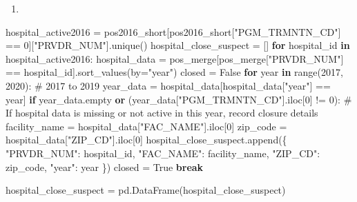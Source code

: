 \documentclass[
  letterpaper,
  DIV=11,
  numbers=noendperiod]{scrartcl}
\newenvironment{Shaded}{\begin{snugshade}}{\end{snugshade}}
\newcommand{\BuiltInTok}[1]{\textcolor[rgb]{0.00,0.23,0.31}{#1}}
\newcommand{\CommentTok}[1]{\textcolor[rgb]{0.37,0.37,0.37}{#1}}
\newcommand{\ControlFlowTok}[1]{\textcolor[rgb]{0.00,0.23,0.31}{\textbf{#1}}}
\newcommand{\DecValTok}[1]{\textcolor[rgb]{0.68,0.00,0.00}{#1}}
\newcommand{\KeywordTok}[1]{\textcolor[rgb]{0.00,0.23,0.31}{\textbf{#1}}}
\newcommand{\NormalTok}[1]{\textcolor[rgb]{0.00,0.23,0.31}{#1}}
\newcommand{\OperatorTok}[1]{\textcolor[rgb]{0.37,0.37,0.37}{#1}}
\newcommand{\StringTok}[1]{\textcolor[rgb]{0.13,0.47,0.30}{#1}}
\newcommand{\VariableTok}[1]{\textcolor[rgb]{0.07,0.07,0.07}{#1}}
\providecommand{\tightlist}{%
  \setlength{\itemsep}{0pt}\setlength{\parskip}{0pt}}\usepackage{longtable,booktabs,array}
\begin{document}
\begin{enumerate}
\def\labelenumi{\arabic{enumi}.}
\tightlist
\item
\end{enumerate}

\begin{Shaded}
\begin{Highlighting}[]
\NormalTok{hospital\_active2016 }\OperatorTok{=}\NormalTok{ pos2016\_short[pos2016\_short[}\StringTok{"PGM\_TRMNTN\_CD"}\NormalTok{] }\OperatorTok{==} \DecValTok{0}\NormalTok{][}\StringTok{"PRVDR\_NUM"}\NormalTok{].unique()}
\NormalTok{hospital\_close\_suspect }\OperatorTok{=}\NormalTok{ []}
\ControlFlowTok{for}\NormalTok{ hospital\_id }\KeywordTok{in}\NormalTok{ hospital\_active2016:}
\NormalTok{    hospital\_data }\OperatorTok{=}\NormalTok{ pos\_merge[pos\_merge[}\StringTok{"PRVDR\_NUM"}\NormalTok{] }\OperatorTok{==}\NormalTok{ hospital\_id].sort\_values(by}\OperatorTok{=}\StringTok{"year"}\NormalTok{)}
\NormalTok{    closed }\OperatorTok{=} \VariableTok{False}
    \ControlFlowTok{for}\NormalTok{ year }\KeywordTok{in} \BuiltInTok{range}\NormalTok{(}\DecValTok{2017}\NormalTok{, }\DecValTok{2020}\NormalTok{):  }\CommentTok{\# 2017 to 2019}
\NormalTok{        year\_data }\OperatorTok{=}\NormalTok{ hospital\_data[hospital\_data[}\StringTok{"year"}\NormalTok{] }\OperatorTok{==}\NormalTok{ year]}
        \ControlFlowTok{if}\NormalTok{ year\_data.empty }\KeywordTok{or}\NormalTok{ (year\_data[}\StringTok{"PGM\_TRMNTN\_CD"}\NormalTok{].iloc[}\DecValTok{0}\NormalTok{] }\OperatorTok{!=} \DecValTok{0}\NormalTok{):}
            \CommentTok{\# If hospital data is missing or not active in this year, record closure details}
\NormalTok{            facility\_name }\OperatorTok{=}\NormalTok{ hospital\_data[}\StringTok{"FAC\_NAME"}\NormalTok{].iloc[}\DecValTok{0}\NormalTok{]}
\NormalTok{            zip\_code }\OperatorTok{=}\NormalTok{ hospital\_data[}\StringTok{"ZIP\_CD"}\NormalTok{].iloc[}\DecValTok{0}\NormalTok{]}
\NormalTok{            hospital\_close\_suspect.append(\{}
                \StringTok{"PRVDR\_NUM"}\NormalTok{: hospital\_id,}
                \StringTok{"FAC\_NAME"}\NormalTok{: facility\_name,}
                \StringTok{"ZIP\_CD"}\NormalTok{: zip\_code,}
                \StringTok{"year"}\NormalTok{: year}
\NormalTok{            \})}
\NormalTok{            closed }\OperatorTok{=} \VariableTok{True}
            \ControlFlowTok{break} 

\NormalTok{hospital\_close\_suspect }\OperatorTok{=}\NormalTok{ pd.DataFrame(hospital\_close\_suspect)}
\end{Highlighting}
\end{Shaded}
\end{document}
